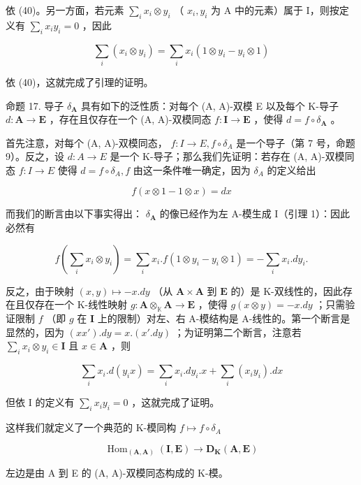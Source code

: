 依 (40)。另一方面，若元素 \(\sum_{i} x_{i} \otimes y_{i}\) （ \(x_{i}, y_{i}\) 为 A 中的元素）属于 I，则按定义有 \(\sum_{i} x_{i} y_{i} = 0\) ，因此

\[
\sum_ {i} \left(x _ {i} \otimes y _ {i}\right) = \sum_ {i} x _ {i} (1 \otimes y _ {i} - y _ {i} \otimes 1)
\]

依 (40)，这就完成了引理的证明。

命题 17. 导子 \(\delta_{\mathbf{A}}\) 具有如下的泛性质：对每个 (A, A)-双模 E 以及每个 K-导子 \(d: \mathbf{A} \to \mathbf{E}\) ，存在且仅存在一个 (A, A)-双模同态 \(f: \mathbf{I} \to \mathbf{E}\) ，使得 \(d = f \circ \delta_{\mathbf{A}}\) 。

首先注意，对每个 (A, A)-双模同态， \(f: I \to E, f \circ \delta_{A}\) 是一个导子（第 7 号，命题 9）。反之，设 \(d: A \to E\) 是一个 K-导子；那么我们先证明：若存在 (A, A)-双模同态 \(f: I \to E\) 使得 \(d = f \circ \delta_{A}, f\) 由这一条件唯一确定，因为 \(\delta_{A}\) 的定义给出

\[
f (x \otimes 1 - 1 \otimes x) = d x
\]

而我们的断言由以下事实得出： \(\delta_{\mathbf{A}}\) 的像已经作为左 A-模生成 I（引理 1）：因此必然有

\[
f \left(\sum_ {i} x _ {i} \otimes y _ {i}\right) = \sum_ {i} x _ {i}. f (1 \otimes y _ {i} - y _ {i} \otimes 1) = - \sum_ {i} x _ {i}. d y _ {i}.
\]

反之，由于映射 \((x,y)\mapsto -x.dy\) （从 \(\mathbf{A}\times \mathbf{A}\) 到 \(\mathbf{E}\) 的）是 K-双线性的，因此存在且仅存在一个 K-线性映射 \(g:\mathbf{A}\otimes_{\mathbb{K}}\mathbf{A}\rightarrow \mathbf{E}\) ，使得 \(g(x\otimes y) = -x.dy\) ；只需验证限制 \(f\) （即 \(g\) 在 \(\mathbf{I}\) 上的限制）对左、右 A-模结构是 A-线性的。第一个断言是显然的，因为 \((xx') .dy = x.(x'.dy)\) ；为证明第二个断言，注意若 \(\sum_{i}x_{i}\otimes y_{i}\in \mathbf{I}\) 且 \(x\in \mathbf{A}\) ，则

\[
\sum_ {i} x _ {i}. d (y _ {i} x) = \sum_ {i} x _ {i}. d y _ {i}. x + \sum_ {i} (x _ {i} y _ {i}). d x
\]

但依 I 的定义有 \(\sum_{i}x_{i}y_{i} = 0\) ，这就完成了证明。

这样我们就定义了一个典范的 K-模同构 \(f \mapsto f \circ \delta_{A}\)

\[
\operatorname{Hom} _ {(\mathbf {A}, \mathbf {A})} (\mathbf {I}, \mathbf {E}) \rightarrow \mathbf {D} _ {\mathbf {K}} (\mathbf {A}, \mathbf {E})
\]

左边是由 A 到 E 的 (A, A)-双模同态构成的 K-模。

